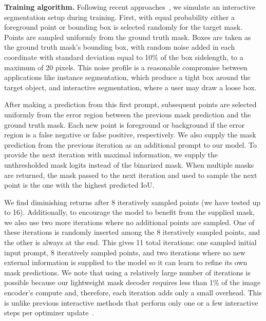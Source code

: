 \documentclass[10pt,twocolumn,letterpaper]{article}
\renewcommand{\paragraph}[1]{\vspace{1.25mm}\noindent\textbf{#1}}
\begin{document}
\paragraph{Training algorithm.} Following recent approaches~\cite{sofiiuk2022reviving,forte2020getting}, we simulate an interactive segmentation setup during training. First, with equal probability either a foreground point or bounding box is selected randomly for the target mask. Points are sampled uniformly from the ground truth mask. Boxes are taken as the ground truth mask's bounding box, with random noise added in each coordinate with standard deviation equal to 10\% of the box sidelength, to a maximum of 20 pixels. This noise profile is a reasonable compromise between applications like instance segmentation, which produce a tight box around the target object, and interactive segmentation, where a user may draw a loose box.

After making a prediction from this first prompt, subsequent points are selected uniformly from the error region between the previous mask prediction and the ground truth mask. Each new point is foreground or background if the error region is a false negative or false positive, respectively. We also supply the mask prediction from the previous iteration as an additional prompt to our model. To provide the next iteration with maximal information, we supply the unthresholded mask logits instead of the binarized mask. When multiple masks are returned, the mask passed to the next iteration and used to sample the next point is the one with the highest predicted IoU.

We find diminishing returns after 8 iteratively sampled points (we have tested up to 16). Additionally, to encourage the model to benefit from the supplied mask, we also use two more iterations where no additional points are sampled. One of these iterations is randomly inserted among the 8 iteratively sampled points, and the other is always at the end. This gives 11 total iterations: one sampled initial input prompt, 8 iteratively sampled points, and two iterations where no new external information is supplied to the model so it can learn to refine its own mask predictions. We note that using a relatively large number of iterations is possible because our lightweight mask decoder requires less than 1\% of the image encoder's compute and, therefore, each iteration adds only a small overhead. This is unlike previous interactive methods that perform only one or a few interactive steps per optimizer update~\cite{mahadevan2018iteratively,bredell2018iterative,forte2020getting,sofiiuk2022reviving}.
\end{document}
